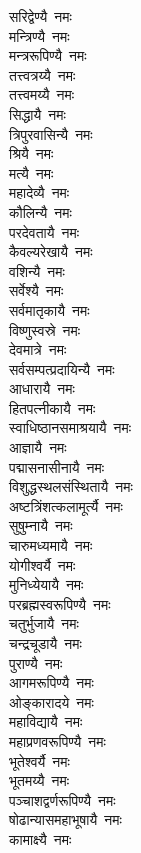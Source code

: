 \begin{flushleft}
\begin{multicols}{2}
सरिद्वेण्यै~नमः\\
मन्त्रिण्यै~नमः\\
मन्त्ररूपिण्यै~नमः\\
तत्त्वत्रय्यै~नमः\\
तत्त्वमय्यै~नमः\\
सिद्धायै~नमः\\
त्रिपुरवासिन्यै~नमः\\
श्रियै~नमः\\
मत्यै~नमः\hfill{}\\
महादेव्यै~नमः\\
कौलिन्यै~नमः\\
परदेवतायै~नमः\\
कैवल्यरेखायै~नमः\\
वशिन्यै~नमः\\
सर्वेश्यै~नमः\\
सर्वमातृकायै~नमः\\
विष्णुस्वस्रे~नमः\\
देवमात्रे~नमः\\
सर्वसम्पत्प्रदायिन्यै~नमः\hfill{}\\
आधारायै~नमः\\
हितपत्नीकायै~नमः\\
स्वाधिष्ठानसमाश्रयायै~नमः\\
आज्ञायै~नमः\\
पद्मासनासीनायै~नमः\\
विशुद्धस्थलसंस्थितायै~नमः\\
अष्टत्रिंशत्कलामूर्त्यै~नमः\\
सुषुम्नायै~नमः\\
चारुमध्यमायै~नमः\\
योगीश्वर्यै~नमः\hfill{}\\
मुनिध्येयायै~नमः\\
परब्रह्मस्वरूपिण्यै~नमः\\
चतुर्भुजायै~नमः\\
चन्द्रचूडायै~नमः\\
पुराण्यै~नमः\\
आगमरूपिण्यै~नमः\\
ओङ्कारादये~नमः\\
महाविद्यायै~नमः\\
महाप्रणवरूपिण्यै~नमः\\
भूतेश्वर्यै~नमः\hfill{}\\
भूतमय्यै~नमः\\
पञ्चाशद्वर्णरूपिण्यै~नमः\\
षोढान्यासमहाभूषायै~नमः\\
कामाक्ष्यै~नमः\\

\end{multicols}
\end{flushleft}
